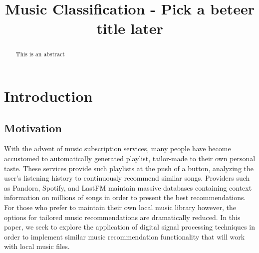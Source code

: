\documentclass[conference]{IEEEtran}
\begin{document}
\title{Music Classification - Pick a beteer title later}
\author{
  \and
  \and
  }

\maketitle
\begin{abstract}
  This is an abstract
\end{abstract}

\section{Introduction}
\subsection{Motivation}
With the advent of music subscription services, many people have become accustomed to automatically generated playlist, tailor-made to their own personal taste. These services provide such playlists at the push of a button, analyzing the user's listening history to continuously recommend similar songs. Providers such as Pandora, Spotify, and LastFM maintain massive databases containing context information on millions of songs in order to present the best recommendations. For those who prefer to maintain their own local music library however, the options for tailored music recommendations are dramatically reduced. In this paper, we seek to explore the application of digital signal processing techniques in order to implement similar music recommendation functionality that will work with local music files. 
\end{document}
